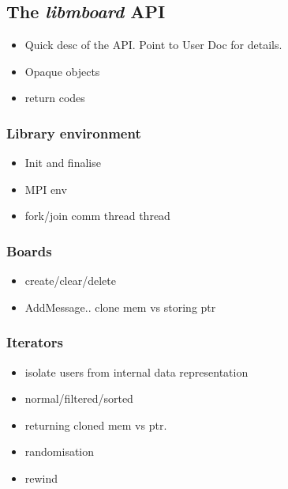 \subsection{The \textit{libmboard} API}
\label{sec:mb_api}

\begin{itemize}
\item Quick desc of the API. Point to User Doc for details.
\item Opaque objects
\item return codes
\end{itemize} 


\subsubsection{Library environment}

\begin{itemize}
\item Init and finalise
\item MPI env
\item fork/join comm thread thread
\end{itemize} 

\subsubsection{Boards}

\begin{itemize}
\item create/clear/delete
\item AddMessage.. clone mem vs storing ptr
\end{itemize} 

\subsubsection{Iterators}

\begin{itemize}
\item isolate users from internal data representation
\item normal/filtered/sorted
\item returning cloned mem vs ptr.
\item randomisation
\item rewind
\end{itemize} 

